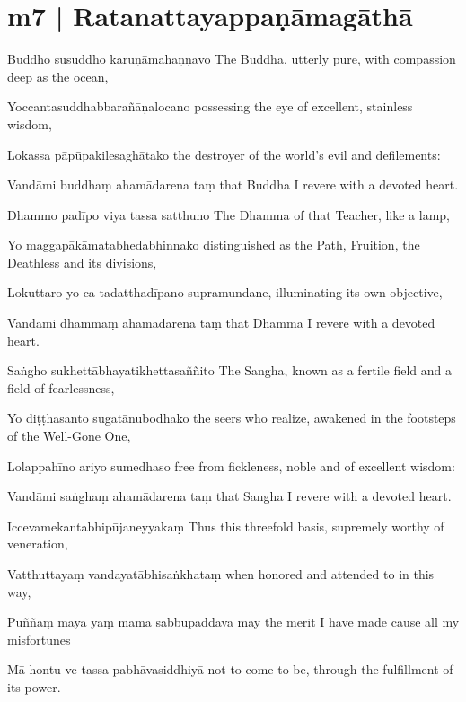 \section*{m7 | Ratanattayappaṇāmagāthā}

\begin{chantsubsection}
  \chantgap
  \chantline
    {Buddho susuddho karuṇāmahaṇṇavo}
    {The Buddha, utterly pure, with compassion deep as the ocean,}

  \chantline
    {Yoccantasuddhabbarañāṇalocano}
    {possessing the eye of excellent, stainless wisdom,}

  \chantline
    {Lokassa pāpūpakilesaghātako}
    {the destroyer of the world’s evil and defilements:}

  \chantline
    {Vandāmi buddhaṃ ahamādarena taṃ}
    {that Buddha I revere with a devoted heart.}

  \chantline
    {Dhammo padīpo viya tassa satthuno}
    {The Dhamma of that Teacher, like a lamp,}

  \chantline
    {Yo maggapākāmatabhedabhinnako}
    {distinguished as the Path, Fruition, the Deathless and its divisions,}

  \chantline
    {Lokuttaro yo ca tadatthadīpano}
    {supramundane, illuminating its own objective,}

  \chantline
    {Vandāmi dhammaṃ ahamādarena taṃ}
    {that Dhamma I revere with a devoted heart.}

  \chantline
    {Saṅgho sukhettābhayatikhettasaññito}
    {The Sangha, known as a fertile field and a field of fearlessness,}

  \chantline
    {Yo diṭṭhasanto sugatānubodhako}
    {the seers who realize, awakened in the footsteps of the Well-Gone One,}

  \chantline
    {Lolappahīno ariyo sumedhaso}
    {free from fickleness, noble and of excellent wisdom:}

  \chantline
    {Vandāmi saṅghaṃ ahamādarena taṃ}
    {that Sangha I revere with a devoted heart.}

  \chantline
    {Iccevamekantabhipūjaneyyakaṃ}
    {Thus this threefold basis, supremely worthy of veneration,}

  \chantline
    {Vatthuttayaṃ vandayatābhisaṅkhataṃ}
    {when honored and attended to in this way,}

  \chantline
    {Puññaṃ mayā yaṃ mama sabbupaddavā}
    {may the merit I have made cause all my misfortunes}

  \chantline
    {Mā hontu ve tassa pabhāvasiddhiyā}
    {not to come to be, through the fulfillment of its power.}
\end{chantsubsection}
